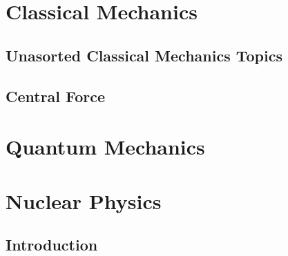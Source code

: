 \documentclass[10pt]{report}
\begin{document}
\pagestyle{empty}




\chapter*{Classical Mechanics}
\section*{Unasorted Classical Mechanics Topics}
\clearpage

\section*{Central Force}
\clearpage

\chapter*{Quantum Mechanics}
\clearpage
\clearpage

\chapter*{Nuclear Physics}
\section*{Introduction}
\clearpage
%
\end{document}
